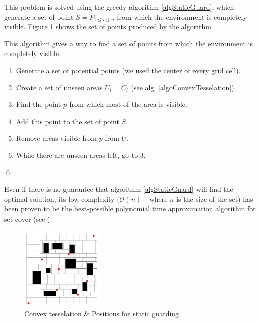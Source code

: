 This problem is solved using the greedy algorithm \ref{algStaticGuard}, which generate a set of point $ S = P_{1\leq i \leq n}$ from which the environment is completely visible. Figure \ref{convexTesselation} shows the set of points produced by the algorithm.

\begin{algorithm}
This algorithm gives a way to find a set of points from which the environment is completely visible.
\begin{enumerate}
	\item Generate a set of potential points (we used the center of every grid cell).
	\item Create a set of unseen areas $U_i = C_i$ (see alg. \ref{algoConvexTesselation}).
	\item Find the point $p$ from which most of the area is visible.
	\item Add this point to the set of point $S$.
	\item Remove areas visible from $p$ from $U$.
	\item While there are unseen areas left, go to 3.
\end{enumerate}
\qed
\label{algStaticGuard}
\end{algorithm}

Even if there is no guarantee that algorithm \ref{algStaticGuard} will find the optimal solution, its low complexity ($\mathcal{O}(n)$ -- where $n$ is the size of the set) has been proven to be the best-possible polynomial time approximation algorithm for set cover (see \cite{approxMinProb}).

\begin{figure}[h!t]
	\begin{center}
	\includegraphics[width=150px]{fig/staticCoverSet.jpg}
	\end{center}
	\caption{Convex tesselation \& Positions for static guarding}
	\label{convexTesselation}
\end{figure}